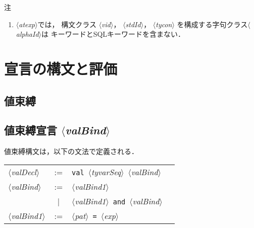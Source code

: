 \documentclass{jbook}
\newif\ifjp
\newcommand{\txt}[2]{#1}
\newcommand{\vbar}{\mbox{\ $|$\ }}
\newcommand{\nonterm}[1]{\mbox{$\langle$}{\it #1}\mbox{$\rangle$}}
\newcommand{\term}[1]{\mbox{{\tt #1}}}
\begin{document}
注
\begin{enumerate}
\item \nonterm{atexp}では，
構文クラス
\nonterm{vid}，
\nonterm{stdId}，
\nonterm{tycon}
を構成する字句クラス\nonterm{alphaId}は
キーワードとSQLキーワードを含まない．
\end{enumerate}

\else%
\fi%

\chapter{\txt{宣言の構文と評価}{}}

\section{\txt{値束縛}{}}
\label{sec:valBinds}
\ifjp%

	宣言の種類毎に，宣言\nonterm{decl}の定義と，それに対応するインター
フェイス仕様\nonterm{interfaceSpec}の定義を与え，それら宣言に対してコン
パイラが計算する型と値を説明する．

	本節では，値束縛を説明する．
\else%
\fi%

\label{sec:syntax:valBind}
\section{\txt{値束縛宣言 \nonterm{valBind}}{}}
\ifjp%
	値束縛構文は，以下の文法で定義される．

\begin{center}
\begin{tabular}{lcll}
\nonterm{valDecl}  &:=   & \term{val}\ \nonterm{tyvarSeq}\ \nonterm{valBind}\\
\nonterm{valBind}  &:=   & \nonterm{valBind1} \\
                   &\vbar& \nonterm{valBind1}\ \term{and}\ \nonterm{valBind}
\\
\nonterm{valBind1} &:=   & \nonterm{pat}\ \term{=}\ \nonterm{exp}\\
\end{tabular}
\end{center}
\end{document}
